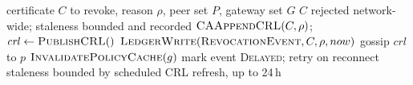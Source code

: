 \begin{widealg}
\caption{Revocation publication and cache invalidation}
\label{alg:revoke}
\small
\begin{algorithmic}[1]
\Require certificate $C$ to revoke, reason $\rho$, peer set $P$,
  gateway set $G$
\Ensure $C$ rejected network-wide; staleness bounded and recorded
\State $\textsc{CAAppendCRL}(C, \rho)$;\;
       $\mathit{crl} \gets \textsc{PublishCRL}()$
\State $\textsc{LedgerWrite}(\textsc{RevocationEvent}, C, \rho, now)$
  \State gossip $\mathit{crl}$ to $p$
\EndFor
{}
    \State $\textsc{InvalidatePolicyCache}(g)$
  \Else
    \State mark event \textsc{Delayed}; retry on reconnect
    \State staleness bounded by scheduled CRL refresh, up to 24\,h
  \EndIf
\EndFor
\end{algorithmic}
\end{widealg}

